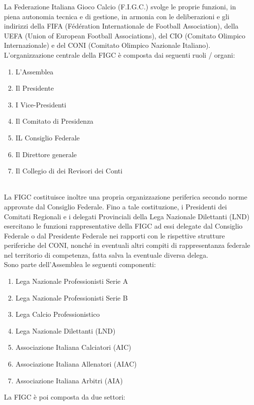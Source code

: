 \documentclass[../uefaC.tex]{subfiles}
\begin{document}
La Federazione Italiana Gioco Calcio (F.I.G.C.) svolge le proprie funzioni, in piena autonomia tecnica e di gestione, in armonia con le deliberazioni e gli indirizzi della FIFA (Fédération Internationale de Football Association), della UEFA (Union of European Football Associations), del CIO (Comitato Olimpico Internazionale) e del CONI (Comitato Olimpico Nazionale Italiano). \hfill \\
L'organizzazione centrale della FIGC è composta dai seguenti ruoli / organi:
\begin{enumerate}
    \item L'Assemblea
    \item Il Presidente
    \item I Vice-Presidenti
    \item Il Comitato di Presidenza
    \item IL Consiglio Federale
    \item Il Direttore generale
    \item Il Collegio di dei Revisori dei Conti
\end{enumerate}
\hfill \\
La FIGC costituisce inoltre una propria organizzazione periferica secondo norme approvate dal Consiglio Federale. Fino a tale costituzione, i Presidenti dei Comitati Regionali e i delegati Provinciali della Lega Nazionale Dilettanti (LND) esercitano le funzioni rappresentative della FIGC ad essi delegate dal Consiglio Federale o dal Presidente Federale nei rapporti con le rispettive strutture periferiche del CONI, nonché in eventuali altri compiti di rappresentanza federale nel territorio di competenza, fatta salva la eventuale diversa delega. \hfill \\
Sono parte dell'Assemblea le seguenti componenti:
\begin{enumerate}
    \item Lega Nazionale Professionisti Serie A
    \item Lega Nazionale Professionisti Serie B
    \item Lega Calcio Professionistico
    \item Lega Nazionale Dilettanti (LND)
    \item Associazione Italiana Calciatori (AIC)
    \item Associazione Italiana Allenatori (AIAC)
    \item Associazione Italiana Arbitri (AIA)
\end{enumerate}
La FIGC è poi composta da due settori:
\end{document}
